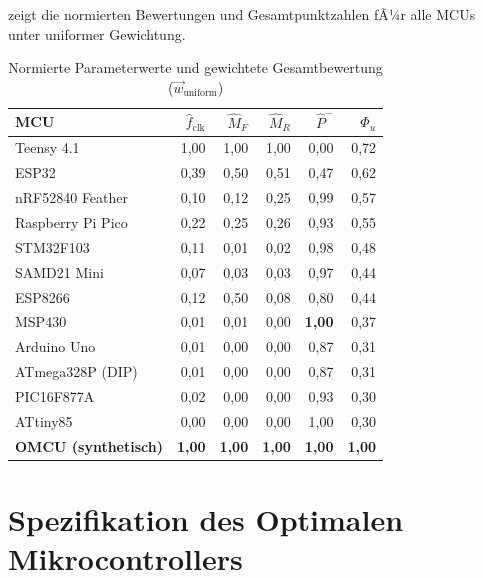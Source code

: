 ﻿\documentclass[12pt, a4paper]{article}
\theoremstyle{plain}
\theoremstyle{definition}
\theoremstyle{remark}
\begin{document}
 zeigt die normierten Bewertungen und
Gesamtpunktzahlen fÃ¼r alle MCUs unter uniformer Gewichtung.

\begin{table}[H]
  \centering
  \caption{Normierte Parameterwerte und gewichtete Gesamtbewertung ($\vec{w}_\text{uniform}$)}
  \label{tab:scores}
  \small
  \begin{tabular}{lrrrrr}
    \toprule
    \textbf{MCU} & $\hat{f}_\text{clk}$ & $\hat{M}_F$ & $\hat{M}_R$ &
    $\hat{P}^{-}$ & $\Phi_u$ \\
    \midrule
    Teensy 4.1       & 1,00 & 1,00 & 1,00 & 0,00 & 0,72 \\
    ESP32            & 0,39 & 0,50 & 0,51 & 0,47 & 0,62 \\
    nRF52840 Feather & 0,10 & 0,12 & 0,25 & 0,99 & 0,57 \\
    Raspberry Pi Pico& 0,22 & 0,25 & 0,26 & 0,93 & 0,55 \\
    STM32F103        & 0,11 & 0,01 & 0,02 & 0,98 & 0,48 \\
    SAMD21 Mini      & 0,07 & 0,03 & 0,03 & 0,97 & 0,44 \\
    ESP8266          & 0,12 & 0,50 & 0,08 & 0,80 & 0,44 \\
    MSP430           & 0,01 & 0,01 & 0,00 & \textbf{1,00} & 0,37 \\
    Arduino Uno      & 0,01 & 0,00 & 0,00 & 0,87 & 0,31 \\
    ATmega328P (DIP) & 0,01 & 0,00 & 0,00 & 0,87 & 0,31 \\
    PIC16F877A       & 0,02 & 0,00 & 0,00 & 0,93 & 0,30 \\
    ATtiny85         & 0,00 & 0,00 & 0,00 & 1,00 & 0,30 \\
    \midrule
    \textbf{OMCU (synthetisch)} & \textbf{1,00} & \textbf{1,00} & \textbf{1,00} &
    \textbf{1,00} & \textbf{1,00} \\
    \bottomrule
  \end{tabular}
\end{table}

\section{Spezifikation des Optimalen Mikrocontrollers}
\label{sec:omcu}
\end{document}
